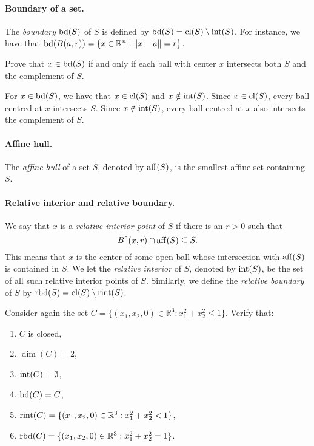 \paragraph{Boundary of a set.}
The \emph{boundary} $\operatorname*{bd}(S)$ of $S$ is defined by $\operatorname*{bd}(S) = \operatorname*{cl}(S) \setminus \operatorname*{int}(S)$.
For instance, we have that $\operatorname*{bd}(B(a, r)) = \{ x \in \mathbb{R}^n : \lVert x - a\rVert = r \}$.

\begin{exercise}
  Prove that $x \in \operatorname*{bd}(S)$ if and only if each ball with center $x$ intersects both $S$ and the complement of $S$.
\end{exercise}

\begin{solution}
  For $x \in \operatorname*{bd}(S)$, we have that $x \in \operatorname*{cl}(S)$ and $x \notin \operatorname*{int}(S)$.
  Since $x \in \operatorname*{cl}(S)$, every ball centred at $x$ intersects $S$.
  Since $x \notin \operatorname*{int}(S)$, every ball centred at $x$ also intersects the complement of $S$.
\end{solution}

\paragraph{Affine hull.}
The \emph{affine hull} of a set $S$, denoted by $\operatorname*{aff}(S)$, is the smallest affine set containing $S$.

\paragraph{Relative interior and relative boundary.}
We say that $x$ is a \emph{relative interior point} of $S$ if there is an $r > 0$ such that
\begin{equation}
  B^\circ(x, r) \cap \operatorname*{aff}(S) \subseteq S.
\end{equation}
This means that $x$ is the center of some open ball whose intersection with $\operatorname*{aff}(S)$ is contained in $S$.
We let the \emph{relative interior} of $S$, denoted by $\operatorname*{int}(S)$, be the set of all such relative interior points of $S$.
Similarly, we define the \emph{relative boundary} of $S$ by $\operatorname*{rbd}(S) = \operatorname*{cl}(S) \setminus \operatorname*{rint}(S)$.

\begin{exercise}
  Consider again the set $C = \{ (x_1, x_2, 0) \in \mathbb{R}^3 : x_1^2 + x_2^2 \leq 1 \}$.
  Verify that:
  \begin{enumerate}[label = (\textit{\roman*})]
    \item $C$ is closed,
    \item $\dim(C) = 2$,
    \item $\operatorname*{int}(C) = \emptyset$,
    \item $\operatorname*{bd}(C) = C$,
    \item $\operatorname*{rint}(C) = \{ (x_1, x_2, 0) \in \mathbb{R}^3 : x_1^2 + x_2^2 < 1 \}$,
    \item $\operatorname*{rbd}(C) = \{ (x_1, x_2, 0) \in \mathbb{R}^3 : x_1^2 + x_2^2 = 1 \}$.
  \end{enumerate}
\end{exercise}

